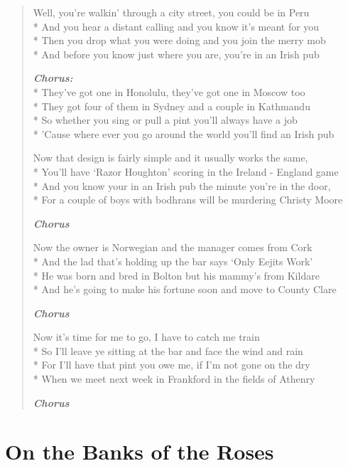 \documentclass[9pt,twoside]{extarticle}
\newenvironment{xverse}{
	\begin{verse}
	\fontsize{8.5}{10.5}\selectfont
	}
	{
	\end{verse}
	\penalty 0
}
\newcommand{\chorusdef}{\textbf{\emph{Chorus:}}\\*}
\newcommand{\chorusmark}[1][1]{%
\vspace{-0.5\stanzaskip}%
\textbf{\emph{Chorus \ifthenelse{\equal{#1}{1}}{}{$\times$ #1}}}%
\vspace{-0.5\stanzaskip}%
}
\begin{document}
\begin{xverse}
Well, you’re walkin’ through a city street, you could be in Peru \\*
And you hear a distant calling and you know it’s meant for you \\*
Then you drop what you were doing and you join the merry mob \\*
And before you know just where you are, you’re in an Irish pub

\chorusdef
They’ve got one in Honolulu, they’ve got one in Moscow too \\*
They got four of them in Sydney and a couple in Kathmandu \\*
So whether you sing or pull a pint you’ll always have a job \\*
’Cause where ever you go around the world you’ll find an Irish pub

Now that design is fairly simple and it usually works the same, \\*
You’ll have ‘Razor Houghton’ scoring in the Ireland - England game \\*
And you know your in an Irish pub the minute you’re in the door, \\*
For a couple of boys with bodhrans will be murdering Christy Moore

\chorusmark

Now the owner is Norwegian and the manager comes from Cork \\*
And the lad that’s holding up the bar says ‘Only Eejits Work’ \\*
He was born and bred in Bolton but his mammy’s from Kildare \\*
And he’s going to make his fortune soon and move to County Clare

\chorusmark

Now it’s time for me to go, I have to catch me train \\*
So I’ll leave ye sitting at the bar and face the wind and rain \\*
For I’ll have that pint you owe me, if I’m not gone on the dry \\*
When we meet next week in Frankford in the fields of Athenry

\chorusmark[2]
\end{xverse}

\section{On the Banks of the Roses}
\end{document}
